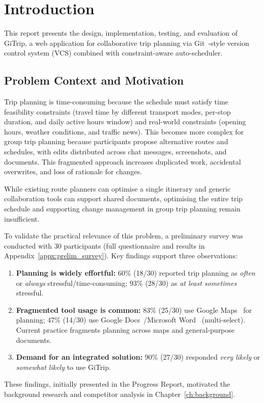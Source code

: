 \chapter{Introduction}
\label{ch:intro}

This report presents the design, implementation, testing, and evaluation of GiTrip, a web application for collaborative trip planning via Git~\cite{ref_git}-style version control system (VCS) combined with constraint-aware auto-scheduler.

\section{Problem Context and Motivation}
\label{sec:motivation}
Trip planning is time-consuming because the schedule must satisfy time feasibility constraints (travel time by different transport modes, per-stop duration, and daily active hours window) and real-world constraints (opening hours, weather conditions, and traffic news). This becomes more complex for group trip planning because participants propose alternative routes and schedules, with edits distributed across chat messages, screenshots, and documents. This fragmented approach increases duplicated work, accidental overwrites, and loss of rationale for changes.

While existing route planners can optimise a single itinerary and generic collaboration tools can support shared documents, optimising the entire trip schedule and supporting change management in group trip planning remain insufficient.

To validate the practical relevance of this problem, a preliminary survey was
conducted with 30 participants (full questionnaire and results in Appendix~\ref{appx:prelim_survey}).
Key findings support three observations:
\begin{enumerate}
  \item \textbf{Planning is widely effortful:} 60\% (18/30) reported trip
        planning as \textit{often} or \textit{always} stressful/time-consuming; 93\% (28/30) as
        \textit{at least sometimes} stressful.
  \item \textbf{Fragmented tool usage is common:} 83\% (25/30) use Google
        Maps~\cite{ref_google_maps} for planning; 47\% (14/30) use Google Docs~\cite{ref_google_docs}/Microsoft Word~\cite{ref_ms_word}
        (multi-select). Current practice fragments planning across maps and
        general-purpose documents.
  \item \textbf{Demand for an integrated solution:} 90\% (27/30) responded
        \textit{very likely} or \textit{somewhat likely} to use GiTrip.
\end{enumerate}
These findings, initially presented in the Progress Report, motivated the
background research and competitor analysis in
Chapter~\ref{ch:background}.

